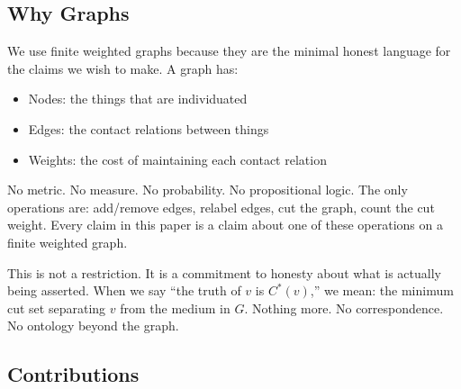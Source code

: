 \documentclass[12pt, a4paper]{article}
\theoremstyle{plain}
\theoremstyle{definition}
\theoremstyle{remark}
\begin{document}
\subsection{Why Graphs}

We use finite weighted graphs because they are the minimal honest language
for the claims we wish to make. A graph has:

\begin{itemize}
  \item Nodes: the things that are individuated
  \item Edges: the contact relations between things
  \item Weights: the cost of maintaining each contact relation
\end{itemize}

No metric. No measure. No probability. No propositional logic. The only
operations are: add/remove edges, relabel edges, cut the graph, count
the cut weight. Every claim in this paper is a claim about one of these
operations on a finite weighted graph.

This is not a restriction. It is a commitment to honesty about what is
actually being asserted. When we say ``the truth of $v$ is $C^*(v)$,'' we
mean: the minimum cut set separating $v$ from the medium in $G$. Nothing
more. No correspondence. No ontology beyond the graph.

\subsection{Contributions}
\end{document}
